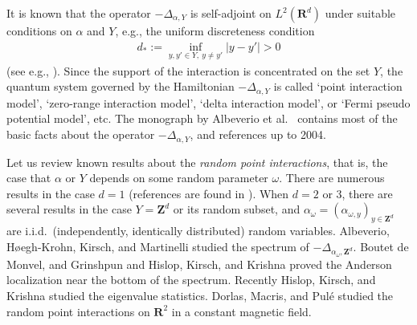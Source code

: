\documentclass[12pt,a4paper]{article}
\begin{document}
It is known that the operator $-\Delta_{\alpha,Y}$ is self-adjoint
on $L^2(\mathbf{R}^d)$
under suitable conditions on $\alpha$ and $Y$,
e.g.,
the uniform discreteness condition
\begin{align}
\label{01_01}
 d_*:=\inf_{y,y'\in Y,\ y\not= y'}|y-y'|>0
\end{align}
(see e.g., \cite{Al-Ge-Ho-Ho}).
Since the support of the interaction is concentrated on the set $Y$,
the quantum system governed by the Hamiltonian $-\Delta_{\alpha,Y}$ is called `point interaction model',
`zero-range interaction model', `delta interaction model',
or `Fermi pseudo potential model', etc.
%
%
%
%
The monograph
by Albeverio et al.\ \cite{Al-Ge-Ho-Ho}
contains
most of the basic facts about the operator $-\Delta_{\alpha,Y}$,
and references up to 2004.




Let us review known results
about the \textit{random point interactions},
that is, the case that $\alpha$ or $Y$ depends 
on some random parameter $\omega$.
There are numerous results in the case $d=1$
(references are found in \cite{Pa-Fi}).
%
When $d=2$ or $3$,
there are several results
in the case $Y=\mathbf{Z}^d$ or its random subset,
and 
$\alpha_\omega=(\alpha_{\omega,y})_{y\in \mathbf{Z}^d}$
are i.i.d.\ (independently, identically distributed) random variables.
Albeverio, H{\o}egh-Krohn, Kirsch, and Martinelli \cite{Al-Ho-Ki-Ma}
studied the spectrum of $-\Delta_{\alpha_\omega,\mathbf{Z}^d}$.
Boutet de Monvel, and Grinshpun  \cite{Bo-Gr}
and 
Hislop, Kirsch, and Krishna \cite{Hi-Ki-Kr1} proved
the Anderson localization near the bottom of the spectrum.
Recently
Hislop, Kirsch, and Krishna \cite{Hi-Ki-Kr2} studied
the eigenvalue statistics.
Dorlas, Macris, and Pul\'e \cite{Do-Ma-Pu}
studied the random point interactions on 
$\mathbf{R}^2$
in a constant magnetic field.
\end{document}
